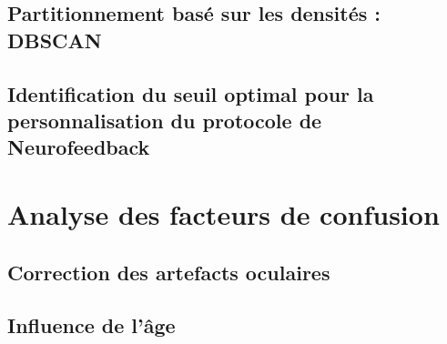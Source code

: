 \subsection{Partitionnement basé sur les densités : DBSCAN}

\subsection{Identification du seuil optimal pour la personnalisation du protocole de Neurofeedback}

\section{Analyse des facteurs de confusion}

\subsection{Correction des artefacts oculaires}

\subsection{Influence de l'âge}